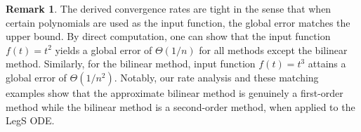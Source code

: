 \documentclass{article}
\theoremstyle{definition}
\newtheorem{remark}{Remark}[section]
\begin{document}
\begin{remark}
    The derived convergence rates are tight in the sense that when certain polynomials are used as the input function, the global error matches the upper bound. By direct computation, one can show that the input function $f(t) = t^2$ yields a global error of $\Theta (1/n)$ for all methods except the bilinear method.
    Similarly, for the bilinear method, input function $f(t) = t^3$ attains a global error of $\Theta(1/n^2)$. 
    Notably, our rate analysis and these matching examples show that the approximate bilinear method is genuinely a first-order method while the bilinear method is a second-order method, when applied to the LegS ODE.
\end{remark}





    
\end{document}
